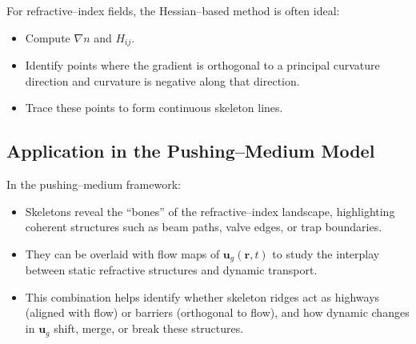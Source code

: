 \documentclass{article}
\begin{document}
For refractive--index fields, the Hessian--based method is often ideal:
\begin{itemize}
    \item Compute $\nabla n$ and $H_{ij}$.
    \item Identify points where the gradient is orthogonal to a principal curvature direction and curvature is negative along that direction.
    \item Trace these points to form continuous skeleton lines.
\end{itemize}

\subsection*{Application in the Pushing--Medium Model}
In the pushing--medium framework:
\begin{itemize}
    \item Skeletons reveal the ``bones'' of the refractive--index landscape, highlighting coherent structures such as beam paths, valve edges, or trap boundaries.
    \item They can be overlaid with flow maps of $\mathbf{u}_g(\mathbf{r},t)$ to study the interplay between static refractive structures and dynamic transport.
    \item This combination helps identify whether skeleton ridges act as highways (aligned with flow) or barriers (orthogonal to flow), and how dynamic changes in $\mathbf{u}_g$ shift, merge, or break these structures.
\end{itemize}
\end{document}

